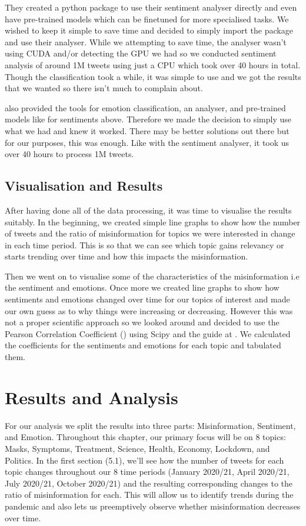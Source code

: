 \documentclass{l4proj}
\begin{document}
They created a python package to use their sentiment analyser directly and even have pre-trained models which can be finetuned for more specialised tasks. We wished to keep it simple to save time and decided to simply import the package and use their analyser. While we attempting to save time, the analyser wasn't using CUDA and/or detecting the GPU we had so we conducted sentiment analysis of around 1M tweets using just a CPU which took over 40 hours in total. Though the classification took a while, it was simple to use and we got the results that we wanted so there isn't much to complain about.

\cite{perez2021pysentimiento} also provided the tools for emotion classification, an analyser, and pre-trained models like for sentiments above. Therefore we made the decision to simply use what we had and knew it worked. There may be better solutions out there but for our purposes, this was enough. Like with the sentiment analyser, it took us over 40 hours to process 1M tweets.

\section{Visualisation and Results}
After having done all of the data processing, it was time to visualise the results suitably. In the beginning, we created simple line graphs to show how the number of tweets and the ratio of misinformation for topics we were interested in change in each time period. This is so that we can see which topic gains relevancy or starts trending over time and how this impacts the misinformation.

Then we went on to visualise some of the characteristics of the misinformation i.e the sentiment and emotions. Once more we created line graphs to show how sentiments and emotions changed over time for our topics of interest and made our own guess as to why things were increasing or decreasing. However this was not a proper scientific approach so we looked around and decided to use the Pearson Correlation Coefficient (\cite{pcc}) using Scipy and the guide at \cite{statpcc}. We calculated the coefficients for the sentiments and emotions for each topic and tabulated them.

\chapter{Results and Analysis} 
For our analysis we split the results into three parts: Misinformation, Sentiment, and Emotion. Throughout this chapter, our primary focus will be on 8 topics: Masks, Symptoms, Treatment, Science, Health, Economy, Lockdown, and Politics. In the first section (5.1), we'll see how the number of tweets for each topic changes throughout our 8 time periods (January 2020/21, April 2020/21, July 2020/21, October 2020/21) and the resulting corresponding changes to the ratio of misinformation for each. This will allow us to identify trends during the pandemic and also lets us preemptively observe whether misinformation decreases over time.
\end{document}
